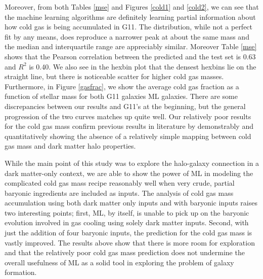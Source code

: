 \documentclass[a4paper,fleqn,usenatbib]{mnras}
\begin{document}
\par 
Moreover, from both Tables \ref{mse} and Figures \ref{cold1} and \ref{cold2}, we can see that the machine learning algorithms are definitely learning partial information about how cold gas is being accumulated in G11. The distribution, while not a perfect fit by any means, does reproduce a narrower peak at about the same mass and the median and interquartile range are appreciably similar. Moreover Table \ref{mse} shows that the Pearson correlation between the predicted and the test set is 0.63 and $R^2$ is 0.40. We also see in the hexbin plot that the densest hexbins lie on the straight line, but there is  noticeable scatter for higher cold gas masses. Furthermore, in Figure \ref{gasfrac}, we show the average cold gas fraction as a function of stellar mass for both G11 galaxies ML galaxies. There are some discrepancies between our results and G11's at the beginning, but the general progression of the two curves matches up quite well. Our relatively poor results for the cold gas mass confirm previous results in literature by demonstrably and quantitatively showing the absence of a relatively simple mapping between cold gas mass and dark matter halo properties. 

\par 
While the main point of this study was to explore the halo-galaxy connection in a dark matter-only context, we are able to show the power of ML in modeling the complicated cold gas mass recipe reasonably well when very crude, partial baryonic ingredients are included as inputs. The analysis of cold gas mass accumulation using both dark matter only inputs and with baryonic inputs raises two interesting points; first, ML, by itself, is unable to pick up on the baryonic evolution involved in gas cooling using solely dark matter inputs. Second, with just the addition of four baryonic inputs, the prediction for the cold gas mass is vastly improved. The results above show that there is more room for exploration and that the relatively poor cold gas mass prediction does not undermine the overall usefulness of ML as a solid tool in exploring the problem of galaxy formation. 
 
\end{document}
